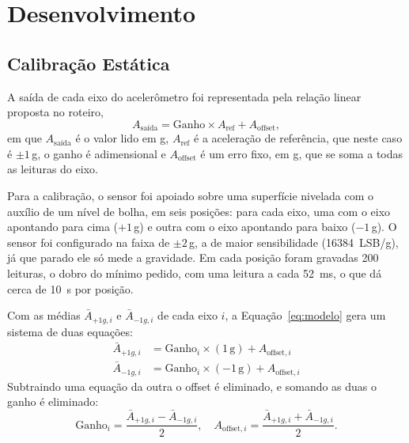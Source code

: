 \documentclass[conference]{IEEEtran}
\begin{document}

\section{Desenvolvimento}

\subsection{Calibração Estática}
A saída de cada eixo do acelerômetro foi representada pela relação linear proposta no roteiro,
\begin{equation}
	A_{\text{saída}} = \text{Ganho} \times A_{\text{ref}} + A_{\text{offset}},
	\label{eq:modelo}
\end{equation}
em que $A_{\text{saída}}$ é o valor lido em g, $A_{\text{ref}}$ é a aceleração de referência, que neste caso é $\pm1$\,g, o ganho é adimensional e $A_{\text{offset}}$ é um erro fixo, em g, que se soma a todas as leituras do eixo.

Para a calibração, o sensor foi apoiado sobre uma superfície nivelada com o auxílio de um nível de bolha, em seis posições: para cada eixo, uma com o eixo apontando para cima ($+1$\,g) e outra com o eixo apontando para baixo ($-1$\,g). O sensor foi configurado na faixa de $\pm2$\,g, a de maior sensibilidade (16384~LSB/g), já que parado ele só mede a gravidade. Em cada posição foram gravadas 200 leituras, o dobro do mínimo pedido, com uma leitura a cada 52~ms, o que dá cerca de 10~s por posição.

Com as médias $\bar{A}_{+1g,i}$ e $\bar{A}_{-1g,i}$ de cada eixo $i$, a Equação~\eqref{eq:modelo} gera um sistema de duas equações:
\begin{align}
	\bar{A}_{+1g,i} &= \text{Ganho}_i \times (1\,\text{g}) + A_{\text{offset},i} \label{eq:sis1}\\
	\bar{A}_{-1g,i} &= \text{Ganho}_i \times (-1\,\text{g}) + A_{\text{offset},i} \label{eq:sis2}
\end{align}
Subtraindo uma equação da outra o offset é eliminado, e somando as duas o ganho é eliminado:
\begin{equation}
	\text{Ganho}_i = \frac{\bar{A}_{+1g,i} - \bar{A}_{-1g,i}}{2}, \quad
	A_{\text{offset},i} = \frac{\bar{A}_{+1g,i} + \bar{A}_{-1g,i}}{2}.
	\label{eq:solucao}
\end{equation}
\end{document}
